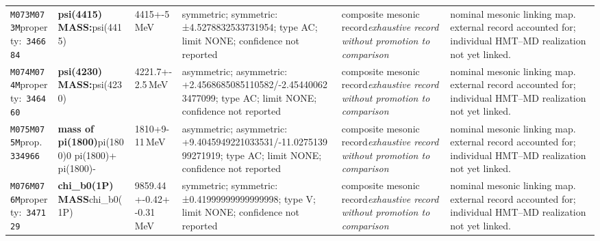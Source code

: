 \begin{landscape}
\begin{longtable}{L{1.85cm}L{4.45cm}L{2.35cm}L{4.05cm}L{3.35cm}L{7.15cm}}
\texttt{M073}\newline \texttt{M073M}\newline property:\ \texttt{346684} & \textbf{psi(4415) MASS:}\newline psi(4415) & 4415+-5\,MeV & symmetric; symmetric: ±4.5278832533731954; type AC; limit NONE; confidence not reported & composite mesonic record\newline \emph{exhaustive record without promotion to comparison} & nominal mesonic linking map. external record accounted for; individual HMT--MD realization not yet linked. \\
\texttt{M074}\newline \texttt{M074M}\newline property:\ \texttt{346460} & \textbf{psi(4230) MASS:}\newline psi(4230) & 4221.7+-2.5\,MeV & asymmetric; asymmetric: +2.4568685085110582/-2.454400623477099; type AC; limit NONE; confidence not reported & composite mesonic record\newline \emph{exhaustive record without promotion to comparison} & nominal mesonic linking map. external record accounted for; individual HMT--MD realization not yet linked. \\
\texttt{M075}\newline \texttt{M075M}\newline prop.\ \texttt{334966} & \textbf{mass of pi(1800)}\newline pi(1800)0 \textbar{}\allowbreak{} pi(1800)+ \textbar{}\allowbreak{} pi(1800)- & 1810+9-11\,MeV & asymmetric; asymmetric: +9.4045949221033531/-11.027513999271919; type AC; limit NONE; confidence not reported & composite mesonic record\newline \emph{exhaustive record without promotion to comparison} & nominal mesonic linking map. external record accounted for; individual HMT--MD realization not yet linked. \\
\texttt{M076}\newline \texttt{M076M}\newline property:\ \texttt{347129} & \textbf{chi\_\allowbreak{}b0(1P) MASS}\newline chi\_\allowbreak{}b0(1P) & 9859.44+-0.42+-0.31\,MeV & symmetric; symmetric: ±0.41999999999999998; type V; limit NONE; confidence not reported & composite mesonic record\newline \emph{exhaustive record without promotion to comparison} & nominal mesonic linking map. external record accounted for; individual HMT--MD realization not yet linked. \\

\end{longtable}
\end{landscape}
